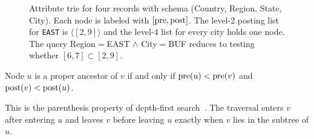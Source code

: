 \begin{figure}[t]
\centering
{}
\caption{Attribute trie for four records with schema (Country, Region, State, City). Each node is labeled with $[\mathrm{pre},\mathrm{post}]$. The level-2 posting list for \texttt{EAST} is $\langle[2,9]\rangle$ and the level-4 list for every city holds one node. The query Region$=$EAST $\wedge$ City$=$BUF reduces to testing whether $[6,7]\subset[2,9]$.}
\label{fig:trie}
\end{figure}

\begin{lemma}
\label{lem:ancestry}
Node $u$ is a proper ancestor of $v$ if and only if $\mathrm{pre}(u)<\mathrm{pre}(v)$ and $\mathrm{post}(v)<\mathrm{post}(u)$.
\end{lemma}
\begin{IEEEproof}
This is the parenthesis property of depth-first search~\cite{cormen2009introduction}. The traversal enters $v$ after entering $u$ and leaves $v$ before leaving $u$ exactly when $v$ lies in the subtree of $u$.
\end{IEEEproof}

